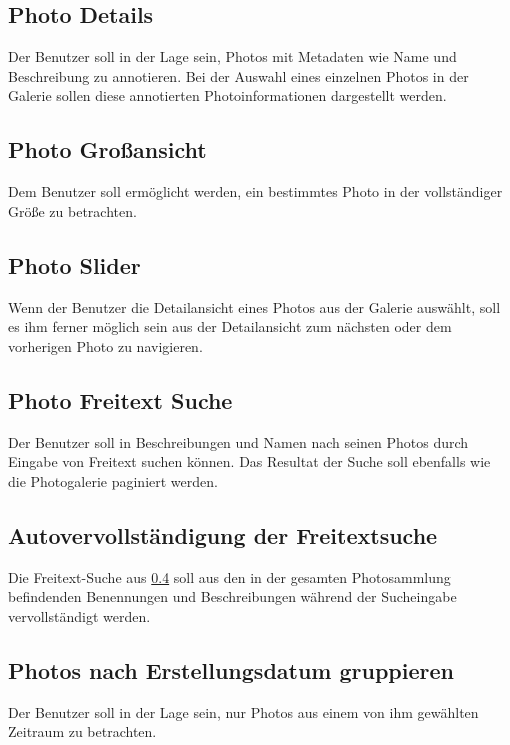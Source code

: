 \subsection{Photo Details}

Der Benutzer soll in der Lage sein, Photos mit Metadaten wie Name und Beschreibung zu annotieren. Bei der Auswahl eines einzelnen Photos in der Galerie sollen diese annotierten Photoinformationen dargestellt werden.

\subsection{Photo Großansicht}

Dem Benutzer soll ermöglicht werden, ein bestimmtes Photo in der vollständiger Größe zu betrachten.

\subsection{Photo Slider}

Wenn der Benutzer die Detailansicht eines Photos aus der Galerie auswählt, soll es ihm ferner möglich sein aus der Detailansicht zum nächsten oder dem vorherigen Photo zu navigieren.

\subsection{Photo Freitext Suche}
\label{ssec:photo_freitext_suche}

Der Benutzer soll in Beschreibungen und Namen nach seinen Photos durch Eingabe von Freitext suchen können. Das Resultat der Suche soll ebenfalls wie die Photogalerie paginiert werden.

\subsection{Autovervollständigung der Freitextsuche}

Die Freitext-Suche aus \ref{ssec:photo_freitext_suche} soll aus den in der gesamten Photosammlung befindenden Benennungen und Beschreibungen während der
Sucheingabe vervollständigt werden.

\subsection{Photos nach Erstellungsdatum gruppieren}

Der Benutzer soll in der Lage sein, nur Photos aus einem von ihm gewählten Zeitraum zu betrachten.


